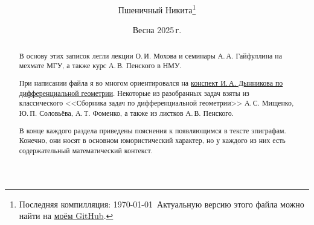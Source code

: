 \documentclass[a4paper, twoside, leqno, 11pt]{article}
\begin{document}
\title{\bfseries\scshape\course}
\date{Весна 2025\,г.}
\author{Пшеничный Никита\thanks{Последняя компилляция: \today\ Актуальную версию этого файла можно найти на \href{https://github.com/pshenikita/Differential-Geometry}{моём GitHub}.}}

\maketitle
\begin{abstract}
	В основу этих записок легли лекции О.\,И. Мохова и семинары А.\,А. Гайфуллина на мехмате МГУ, а также курс А.\,В. Пенского в НМУ.

	При написании файла я во многом ориентировался на \href{https://teach-in.ru/file/methodical/pdf/classical-difgeom-dynnikov-M.pdf}{конспект И.\,А. Дынникова по дифференциальной геометрии}. Некоторые из разобранных задач взяты из классического <<Сборника задач по дифференциальной геометрии>> А.\,С. Мищенко, Ю.\,П. Соловьёва, А.\,Т. Фоменко, а также из листков А.\,В. Пенского.

	В конце каждого раздела приведены пояснения к появляющимся в тексте эпиграфам. Конечно, они носят в основном юмористический характер, но у каждого из них есть содержательный математический контекст.
\end{abstract}

\tableofcontents




\end{document}
